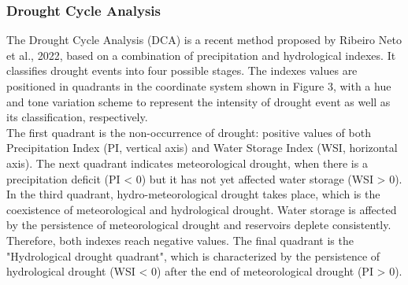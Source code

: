 \documentclass[draft]{agujournal2019}
\begin{document}
\subsubsection{Drought Cycle Analysis}
The Drought Cycle Analysis (DCA) is a recent method proposed by Ribeiro Neto et al., 2022, based on a combination of precipitation and hydrological indexes. It classifies drought events into four possible stages. The indexes values are positioned in quadrants in the coordinate system shown in Figure 3, with a hue and tone variation scheme to represent the intensity of drought event as well as its classification, respectively.\\
The first quadrant is the non-occurrence of drought: positive values of both Precipitation Index (PI, vertical axis) and Water Storage Index (WSI, horizontal axis). The next quadrant indicates meteorological drought, when there is a precipitation deficit (PI < 0) but it has not yet affected water storage (WSI > 0). In the third quadrant, hydro-meteorological drought takes place, which is the coexistence of meteorological and hydrological drought. Water storage is affected by the persistence of meteorological drought and reservoirs deplete consistently. Therefore, both indexes reach negative values. The final quadrant is the "Hydrological drought quadrant", which is characterized by the persistence of hydrological drought (WSI < 0) after the end of meteorological drought (PI > 0).\\
\end{document}
